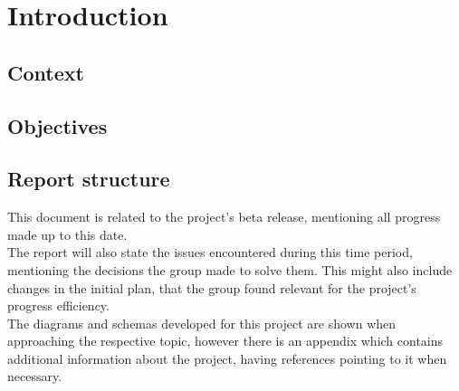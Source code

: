 %
%

\chapter{Introduction}

\section{Context}


\section{Objectives}



\section{Report structure}

This document is related to the project's beta release, mentioning all progress made up to this date.\\

The report will also state the issues encountered during this time period, mentioning the 
decisions the group made to solve them. This might also include changes in the
initial plan, that the group found relevant for the project's progress efficiency.\\

The diagrams and schemas developed for this project are shown when approaching the respective topic,
however there is an appendix which contains additional information about the project, having 
references pointing to it when necessary.
